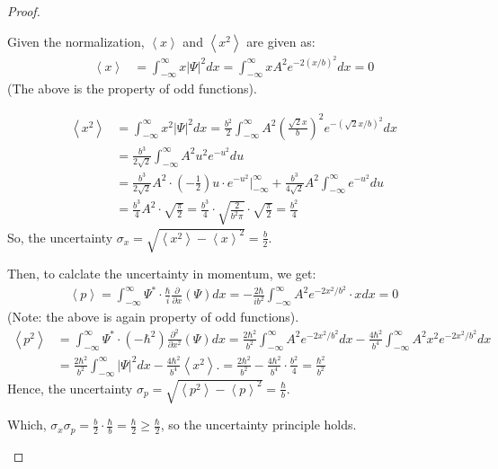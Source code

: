 \documentclass{article}
\begin{document}
\begin{proof}
\begin{itemize}
        \hfil

        Given the normalization, $\left<x\right>$ and $\left<x^2\right>$ are given as:
        \begin{align}
            \left<x\right>&=\int_{-\infty}^{\infty}x|\Psi|^2dx = \int_{-\infty}^{\infty}xA^2e^{-2(x/b)^2}dx = 0
        \end{align}
        (The above is the property of odd functions).

        \begin{align}
            \left<x^2\right>&=\int_{-\infty}^{\infty}x^2|\Psi|^2dx = \frac{b^2}{2}\int_{-\infty}^{\infty}A^2\left(\frac{\sqrt{2}x}{b}\right)^2e^{-(\sqrt{2}x/b)^2}dx\\
            &= \frac{b^3}{2\sqrt{2}}\int_{-\infty}^{\infty}A^2 u^2e^{-u^2}du\\\
            &= \frac{b^3}{2\sqrt{2}}A^2\cdot\left(-\frac{1}{2}\right)u\cdot e^{-u^2}\bigg|_{-\infty}^{\infty}+\frac{b^3}{4\sqrt{2}}A^2\int_{-\infty}^{\infty}e^{-u^2}du\\
            &= \frac{b^3}{4}A^2\cdot\sqrt{\frac{\pi}{2}}=\frac{b^3}{4}\cdot\sqrt{\frac{2}{b^2\pi}}\cdot\sqrt{\frac{\pi}{2}}=\frac{b^2}{4}
        \end{align}
        So, the uncertainty $\sigma_x=\sqrt{\left<x^2\right>-\left<x\right>^2}=\frac{b}{2}$.

        \hfil

        Then, to calclate the uncertainty in momentum, we get:
        \begin{align}
            \left<p\right>=\int_{-\infty}^{\infty}\Psi^*\cdot \frac{\hbar}{i}\frac{\partial}{\partial x}(\Psi) dx = -\frac{2\hbar}{ib^2}\int_{-\infty}^{\infty}A^2e^{-2x^2/b^2}\cdot x dx = 0
        \end{align}
        (Note: the above is again property of odd functions).
        \begin{align}
            \left<p^2\right>&=\int_{-\infty}^{\infty}\Psi^*\cdot(-\hbar^2)\frac{\partial^2}{\partial x^2}(\Psi)dx = \frac{2\hbar^2}{b^2}\int_{-\infty}^{\infty}A^2e^{-2x^2/b^2}dx - \frac{4\hbar^2}{b^4}\int_{-\infty}^{\infty}A^2x^2e^{-2x^2/b^2}dx\\
            &= \frac{2\hbar^2}{b^2}\int_{-\infty}^{\infty}|\Psi|^2dx - \frac{4\hbar^2}{b^4}\left<x^2\right>. = \frac{2\hbar^2}{b^2}-\frac{4\hbar^2}{b^4}\cdot \frac{b^2}{4} = \frac{\hbar^2}{b^2}
        \end{align}
        Hence, the uncertainty $\sigma_p=\sqrt{\left<p^2\right>-\left<p\right>^2} = \frac{\hbar}{b}$.

        Which, $\sigma_x\sigma_p = \frac{b}{2}\cdot\frac{\hbar}{b} = \frac{\hbar}{2}\geq \frac{\hbar}{2}$, so the uncertainty principle holds.
    \end{itemize}
\end{proof}
\end{document}
